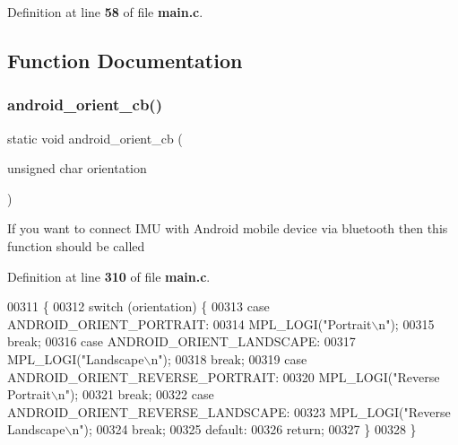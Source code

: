 Definition at line \textbf{ 58} of file \textbf{ main.\+c}.



\subsection{Function Documentation}
\mbox{\label{group__eMPL_gaa4a8ed4fa732bc82b2b518d80d196297}} 
\subsubsection{android\+\_\+orient\+\_\+cb()}
{\footnotesize\ttfamily static void android\+\_\+orient\+\_\+cb (\begin{DoxyParamCaption}\item[{unsigned char}]{orientation }\end{DoxyParamCaption})\hspace{0.3cm}{\ttfamily [static]}}

If you want to connect I\+MU with Android mobile device via bluetooth then this function should be called 

Definition at line \textbf{ 310} of file \textbf{ main.\+c}.


\begin{DoxyCode}
00311 \{
00312     \textcolor{keywordflow}{switch} (orientation) \{
00313     \textcolor{keywordflow}{case} ANDROID\_ORIENT\_PORTRAIT:
00314         MPL\_LOGI(\textcolor{stringliteral}{"Portrait\(\backslash\)n"});
00315         \textcolor{keywordflow}{break};
00316     \textcolor{keywordflow}{case} ANDROID\_ORIENT\_LANDSCAPE:
00317         MPL\_LOGI(\textcolor{stringliteral}{"Landscape\(\backslash\)n"});
00318         \textcolor{keywordflow}{break};
00319     \textcolor{keywordflow}{case} ANDROID\_ORIENT\_REVERSE\_PORTRAIT:
00320         MPL\_LOGI(\textcolor{stringliteral}{"Reverse Portrait\(\backslash\)n"});
00321         \textcolor{keywordflow}{break};
00322     \textcolor{keywordflow}{case} ANDROID\_ORIENT\_REVERSE\_LANDSCAPE:
00323         MPL\_LOGI(\textcolor{stringliteral}{"Reverse Landscape\(\backslash\)n"});
00324         \textcolor{keywordflow}{break};
00325     \textcolor{keywordflow}{default}:
00326         \textcolor{keywordflow}{return};
00327     \}
00328 \}
\end{DoxyCode}
\mbox{\label{group__eMPL_ga97b092893abbc0853590db8530636b63}} 
